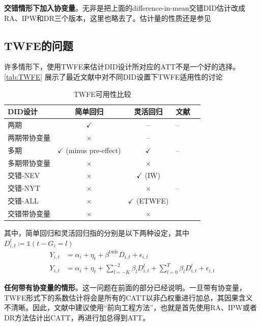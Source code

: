 \documentclass[../didNotes.tex]{subfiles}
\begin{document}
\textbf{交错情形下加入协变量}。无非是把上面的difference-in-mean交错DID估计改成RA、IPW和DR三个版本，这里也略去了。估计量的性质还是参见
\textcite{SantAnna.Zhao2020, callaway2021}

\subsection{TWFE的问题}

许多情形下，使用TWFE来估计DID设计所对应的ATT不是一个好的选择。\autoref{tab:TWFE} 展示了最近文献中对不同DID设置下TWFE适用性的讨论

\begin{table}[ht]
  \caption{TWFE可用性比较}\label{tab:TWFE}
  \centering
  \begin{tabularx}{\linewidth}{@{} p{3.2cm} *{2}{C} L p{3.2cm} @{}}
    \toprule
    DID设计 & 简单回归 & 灵活回归 & 文献 \\
    \midrule
    两期 & $\checkmark$ & -- & -- \\
    两期带协变量 & $\times$ & -- & \textcite{caetano2024} \\
    多期 & $\checkmark$ (minus pre-effect) & $\checkmark$ & -- \\
    多期带协变量 & $\times$ & $\times$ & \textcite{callaway2021} \\
    交错-NEV & $\times$ & $\checkmark$ (IW) & \textcite{sun2021} \\
    交错-NYT & $\times$ & $\times$ & -- \\
    交错-ALL & $\times$ & $\checkmark$ (ETWFE) & \textcite{wooldridge2021} \\
    交错带协变量 & $\times$ & $\times$ & \textcite{callaway2021} \\
    \bottomrule
  \end{tabularx}
\end{table}
其中，简单回归和灵活回归指的分别是以下两种设定，其中 $D_{i,t}^{l} \coloneqq \mathbb{1}(t-G_{i}=l)$
\begin{align*}
  Y_{i,t} &= \alpha_{i} + \eta_{t} + \beta^{\text{twfe}} D_{i,t} + \epsilon_{i,t} \\
  Y_{i,t} &= \alpha_{i} + \eta_{t} + \sum_{l = -K}^{-2} \beta_{l} D_{i,t}^{l} + \sum_{l=0}^{T} \beta_{l}
  D_{i,t}^{l} + \epsilon_{i,t}
\end{align*}

\textbf{任何带有协变量的情形}。这一问题在前面的部分已经说明。一旦带有协变量，TWFE形式下的系数估计将会是所有的CATT以非凸权重进行加总，其因果含义
不清晰。因此，文献中建议使用``前向工程方法''，也就是首先使用RA、IPW或者DR方法估计出CATT，再进行加总得到ATT。
\end{document}
